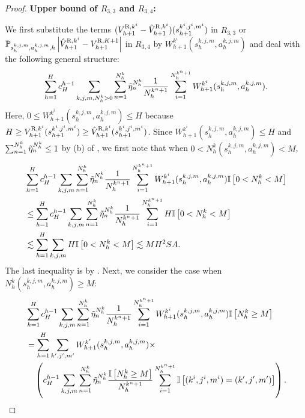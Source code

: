 \documentclass{article}
\newcommand{\R}{\textnormal{R}}
\begin{document}
\begin{proof}
\textbf{Upper bound of $R_{3,3}$ and $R_{3,4}$:}

We first substitute the terms $(V_{h+1}^{\R,k^i}-\hat{V}_{h+1}^{\R,k^i})(s_{h+1}^{k^i,j^i,m^i})$ in $R_{3,3}$ or $\mathbb{P}_{s_h^{k,j,m}, a_h^{k,j,m},h}\left|\hat{V}_{h+1}^{\R,k^i}-V_{h+1}^{\R,K+1}\right|$ in $R_{3,4}$ by $W_{h+1}^{k^i}(s_{h}^{k,j,m},a_{h}^{k,j,m})$ and deal with the following general structure:
\begin{align*}
    \sum_{h=1}^H c_H^{h-1}\sum_{k,j,m,N_h^k >0}\sum_{n=1}^{N_h^k} \Tilde{\eta}_n^{N_h^k}\frac{1}{N_h^{k^n+1}} \sum_{i=1}^{N_h^{k^n+1}}W_{h+1}^{k^i}(s_{h}^{k,j,m},a_{h}^{k,j,m}).
\end{align*}
Here, $0\leq W_{h+1}^{k^i}(s_{h}^{k,j,m},a_{h}^{k,j,m}) \leq H$ because $H \geq V_{h+1}^{\R,k^i}(s_{h+1}^{k^i,j^i,m^i})\geq\hat{V}_{h+1}^{\R,k^i}(s_{h+1}^{k^i,j^i,m^i})$. Since $W_{h+1}^{k^i}(s_{h}^{k,j,m},a_{h}^{k,j,m}) \leq H$ and $\sum_{n=1}^{N_h^k} \Tilde{\eta}_n^{N_h^k} \leq 1$ by (b) of , we first note that when $0 < N_h^k(s_h^{k,j,m}, a_h^{k,j,m}) < M$,
\begin{align}
\label{exchangewbeginsmall}
    &\sum_{h=1}^H c_H^{h-1}\sum_{k,j,m}\sum_{n=1}^{N_h^k} \Tilde{\eta}_n^{N_h^k}\frac{1}{N_h^{k^n+1}} \sum_{i=1}^{N_h^{k^n+1}}W_{h+1}^{k^i}(s_{h}^{k,j,m},a_{h}^{k,j,m})\mathbb{I}\left[0<N_h^k< M\right]\nonumber\\
    &\leq \sum_{h=1}^H c_H^{h-1}\sum_{k,j,m}\sum_{n=1}^{N_h^k} \Tilde{\eta}_n^{N_h^k}\frac{1}{N_h^{k^n+1}} \sum_{i=1}^{N_h^{k^n+1}}H\mathbb{I}\left[0<N_h^k< M\right] \nonumber\\
    &\lesssim \sum_{h=1}^H \sum_{k,j,m}H\mathbb{I}\left[0<N_h^k< M\right] \lesssim MH^2SA.
\end{align}
The last inequality is by . Next, we consider the case when $N_h^k(s_h^{k,j,m}, a_h^{k,j,m}) \geq M$:
\begin{align}
\label{exchangewbegin}
    &\sum_{h=1}^H c_H^{h-1}\sum_{k,j,m}\sum_{n=1}^{N_h^k} \Tilde{\eta}_n^{N_h^k}\frac{1}{N_h^{k^n+1}} \sum_{i=1}^{N_h^{k^n+1}}W_{h+1}^{k^i}(s_{h}^{k,j,m},a_{h}^{k,j,m})\mathbb{I}\left[N_h^k\geq M\right]\nonumber\\
    &= \sum_{h=1}^H\sum_{k',j',m'}W_{h+1}^{k'}(s_{h}^{k,j,m},a_{h}^{k,j,m}) \times \nonumber\\
    &\quad \left(c_H^{h-1}\sum_{k,j,m}\sum_{n=1}^{N_h^k}\Tilde{\eta}_n^{N_h^k}\frac{\mathbb{I}\left[N_h^k\geq M\right]}{N_h^{k^n+1}} \sum_{i=1}^{N_h^{k^n+1}}\mathbb{I}\left[(k^i,j^i,m^i) = (k',j',m')\right]\right).
\end{align}

\end{proof}
\end{document}
